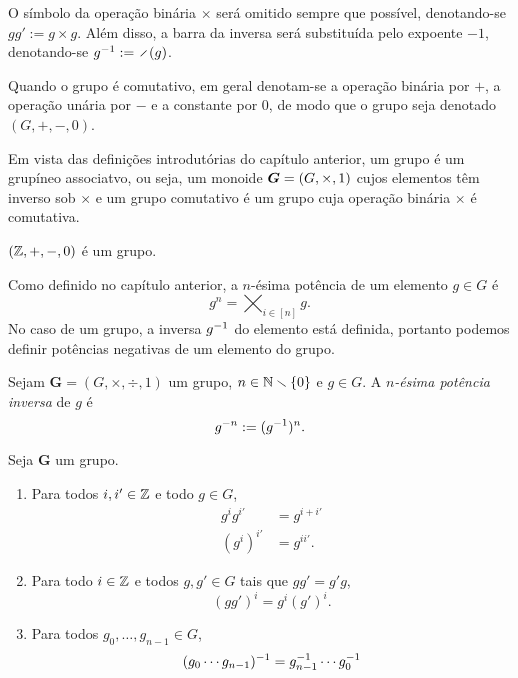 \begin{notation}
O símbolo da operação binária $\times$ será omitido sempre que possível, denotando-se $gg' := g \times g$. Além disso, a barra da inversa será substituída pelo expoente $-1$, denotando-se $g\inv := \div(g)$.

Quando o grupo é comutativo, em geral denotam-se a operação binária por $+$, a operação unária por $-$ e a constante por $0$, de modo que o grupo seja denotado $(G,+,-,0)$.
\end{notation}

Em vista das definições introdutórias do capítulo anterior, um grupo é um grupíneo associatvo, ou seja, um monoide $\bm G=(G, \times, 1)$ cujos elementos têm inverso sob $\times$ e um grupo comutativo é um grupo cuja operação binária $\times$ é comutativa.

\begin{example}
$(\mathbb{Z},+,-,0)$ é um grupo.
\end{example}

Como definido no capítulo anterior, a $n$-ésima potência de um elemento $g \in G$ é
	\begin{equation*}
	g^n = \bigtimes_{i \in [n]} g.
	\end{equation*}
No caso de um grupo, a inversa $g^{-1}$ do elemento está definida, portanto podemos definir potências negativas de um elemento do grupo.

\begin{definition}
Sejam $\bm G = (G,\times,\div,1)$ um grupo, $n \in \mathbb{N} \smallsetminus \{0\}$ e $g \in G$. A \emph{$n$-ésima potência inversa} de $g$ é
	\begin{equation*}
	g^{-n} := (g^{-1})^n.
	\end{equation*}
\end{definition}

\begin{exercise}
Seja $\bm G$ um grupo.
	\begin{enumerate}
	\item Para todos $i,i' \in \mathbb{Z}$ e todo $g \in G$,
		\begin{align*}
		g^i g^{i'} &= g^{i+i'} \\
		(g^i)^{i'} &= g^{ii'}.
		\end{align*}
	\item Para todo $i \in \mathbb{Z}$ e todos $g,g' \in G$ tais que $gg'=g'g$,
		\begin{equation*}
		(gg')^i = g^i(g')^i.
		\end{equation*}
	\item Para todos $g_0, \ldots, g_{n-1} \in G$,%
		\begin{equation*}
		(g_0 \cdots g_{n-1})^{-1} = g_{n-1}^{-1} \cdots g_0^{-1}
		\end{equation*}
	\end{enumerate}
\end{exercise}

